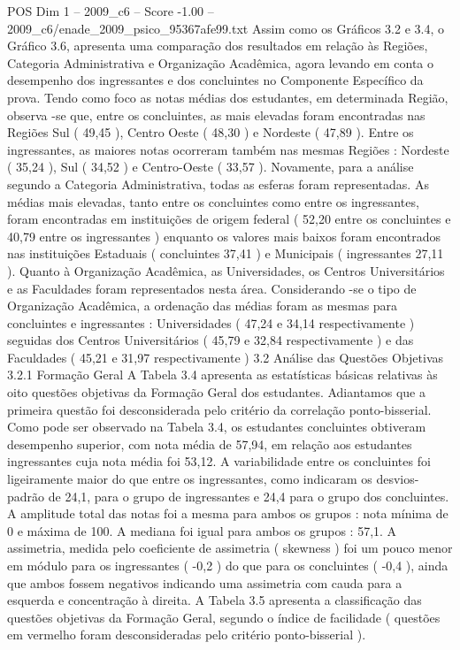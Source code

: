 \begin{textsample}{POS Dim 1 – 2009\_c6 – Score -1.00 – 2009\_c6/enade\_2009\_psico\_95367afe99.txt}
Assim como os Gráficos 3.2 e 3.4, o Gráfico 3.6, apresenta uma comparação dos resultados em relação às Regiões, Categoria Administrativa e Organização Acadêmica, agora levando em conta o desempenho dos ingressantes e dos concluintes no Componente Específico da prova.
Tendo como foco as notas médias dos estudantes, em determinada Região, observa -se que, entre os concluintes, as mais elevadas foram encontradas nas Regiões Sul ( 49,45 ), Centro Oeste ( 48,30 ) e Nordeste ( 47,89 ).
Entre os ingressantes, as maiores notas ocorreram também nas mesmas Regiões : Nordeste ( 35,24 ), Sul ( 34,52 ) e Centro-Oeste ( 33,57 ).
Novamente, para a análise segundo a Categoria Administrativa, todas as esferas foram representadas.
As médias mais elevadas, tanto entre os concluintes como entre os ingressantes, foram encontradas em instituições de origem federal ( 52,20 entre os concluintes e 40,79 entre os ingressantes ) enquanto os valores mais baixos foram encontrados nas instituições Estaduais ( concluintes 37,41 ) e Municipais ( ingressantes 27,11 ).
Quanto à Organização Acadêmica, as Universidades, os Centros Universitários e as Faculdades foram representados nesta área.
Considerando -se o tipo de Organização Acadêmica, a ordenação das médias foram as mesmas para concluintes e ingressantes : Universidades ( 47,24 e 34,14 respectivamente ) seguidas dos Centros Universitários ( 45,79 e 32,84 respectivamente ) e das Faculdades ( 45,21 e 31,97 respectivamente ) 3.2 Análise das Questões Objetivas 3.2.1 Formação Geral A Tabela 3.4 apresenta as estatísticas básicas relativas às oito questões objetivas da Formação Geral dos estudantes.
Adiantamos que a primeira questão foi desconsiderada pelo critério da correlação ponto-bisserial.
Como pode ser observado na Tabela 3.4, os estudantes concluintes obtiveram desempenho superior, com nota média de 57,94, em relação aos estudantes ingressantes cuja nota média foi 53,12.
A variabilidade entre os concluintes foi ligeiramente maior do que entre os ingressantes, como indicaram os desvios-padrão de 24,1, para o grupo de ingressantes e 24,4 para o grupo dos concluintes.
A amplitude total das notas foi a mesma para ambos os grupos : nota mínima de 0 e máxima de 100.
A mediana foi igual para ambos os grupos : 57,1.
A assimetria, medida pelo coeficiente de assimetria ( skewness ) foi um pouco menor em módulo para os ingressantes ( -0,2 ) do que para os concluintes ( -0,4 ), ainda que ambos fossem negativos indicando uma assimetria com cauda para a esquerda e concentração à direita.
A Tabela 3.5 apresenta a classificação das questões objetivas da Formação Geral, segundo o índice de facilidade ( questões em vermelho foram desconsideradas pelo critério ponto-bisserial ).

\end{textsample}
